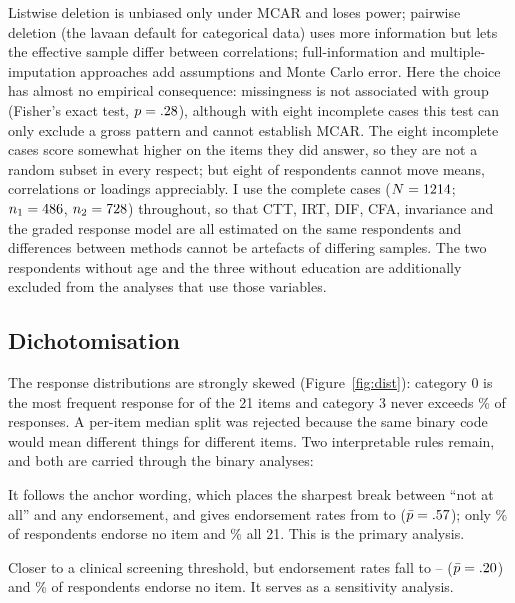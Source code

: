 \documentclass[11pt,a4paper]{article}
\begin{document}
Listwise deletion is unbiased only under MCAR and loses power; pairwise deletion (the lavaan default
for categorical data) uses more information but lets the effective sample differ
between correlations; full-information and multiple-imputation approaches add
assumptions and Monte Carlo error. Here the choice has almost no empirical
consequence: missingness is not associated with group (Fisher's exact test,
$p=.28$), although with eight incomplete cases this test can only exclude a
gross pattern and cannot establish MCAR. The eight incomplete cases score somewhat
higher on the items they did answer, so they are not a random subset in every respect;
but eight of \NTotal{} respondents cannot move means, correlations or loadings
appreciably. I use the complete cases ($N=1214$; $n_1=486$,
$n_2=728$) throughout, so that CTT, IRT, DIF, CFA, invariance and
the graded response model are all estimated on the same respondents and differences
between methods cannot be artefacts of differing samples. The two respondents without
age and the three without education are additionally excluded from the analyses that
use those variables.

\subsection{Dichotomisation}\label{sec:dich}

The response distributions are strongly skewed (Figure~\ref{fig:dist}): category 0
is the most frequent response for \NItemsModalZero{} of the 21 items and category 3
never exceeds \MaxPctCatThree\% of responses. A per-item median split was rejected
because the same binary code would mean different things for different items. Two
interpretable rules remain, and both are carried through the binary analyses:

\begin{description}[leftmargin=1.6em,itemsep=2pt,topsep=3pt]
\item[Rule A ($0$ vs.\ $1$--$3$): ``the symptom applied at all''.] It follows the
  anchor wording, which places the sharpest break between ``not at all'' and any
  endorsement, and gives endorsement rates from \PMinA{} to \PMaxA{}
  ($\bar p=.57$); only \FloorA\% of respondents endorse no item and \CeilA\% all
  21. This is the primary analysis.
\item[Rule B ($0$--$1$ vs.\ $2$--$3$): ``applied to a considerable degree''.] Closer
  to a clinical screening threshold, but endorsement rates fall to \PMinB--\PMaxB{}
  ($\bar p=.20$) and \FloorB\% of respondents endorse no item. It serves as a
  sensitivity analysis.
\end{description}
\end{document}
